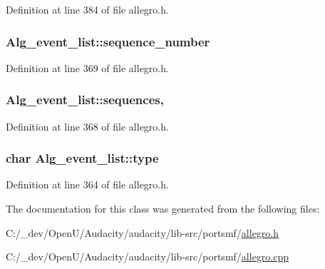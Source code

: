 Definition at line 384 of file allegro.\+h.

\subsubsection[{\texorpdfstring{sequence\+\_\+number}{sequence_number}}]{ Alg\+\_\+event\+\_\+list\+::sequence\+\_\+number\hspace{0.3cm}{\ttfamily [protected]}}\hypertarget{class_alg__event__list_a23063c9dafd7ddec6ac72016dfb9056f}{}\label{class_alg__event__list_a23063c9dafd7ddec6ac72016dfb9056f}


Definition at line 369 of file allegro.\+h.

\subsubsection[{\texorpdfstring{sequences}{sequences}}]{ Alg\+\_\+event\+\_\+list\+::sequences\hspace{0.3cm}{\ttfamily [static]}, {\ttfamily [protected]}}\hypertarget{class_alg__event__list_a60130bda985a5ac5321ad803fcea570d}{}\label{class_alg__event__list_a60130bda985a5ac5321ad803fcea570d}


Definition at line 368 of file allegro.\+h.

\subsubsection[{\texorpdfstring{type}{type}}]{\setlength{\rightskip}{0pt plus 5cm}char Alg\+\_\+event\+\_\+list\+::type\hspace{0.3cm}{\ttfamily [protected]}}\hypertarget{class_alg__event__list_a9ab980471417c440b1d62385c4d686f7}{}\label{class_alg__event__list_a9ab980471417c440b1d62385c4d686f7}


Definition at line 364 of file allegro.\+h.



The documentation for this class was generated from the following files\+:\begin{DoxyCompactItemize}
\item 
C\+:/\+\_\+dev/\+Open\+U/\+Audacity/audacity/lib-\/src/portsmf/\hyperlink{allegro_8h}{allegro.\+h}\item 
C\+:/\+\_\+dev/\+Open\+U/\+Audacity/audacity/lib-\/src/portsmf/\hyperlink{allegro_8cpp}{allegro.\+cpp}\end{DoxyCompactItemize}
